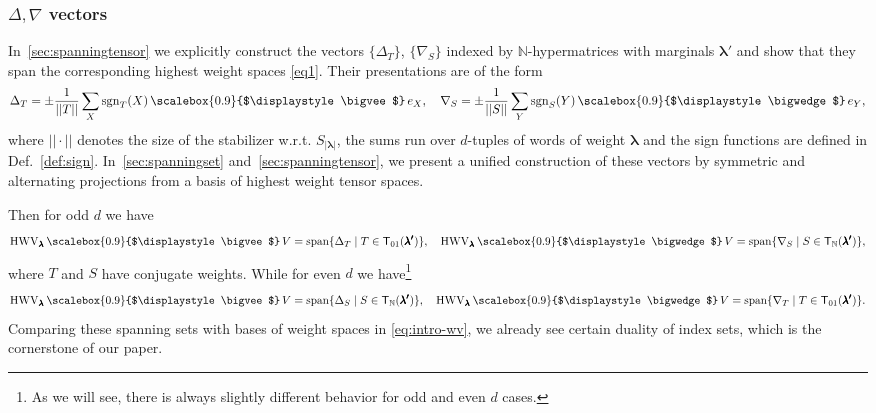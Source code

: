 \documentclass[12pt, reqno]{amsart}
\theoremstyle{definition}
\newcommand{\sgn}{\mathrm{sgn}}
\let\oldbigwedge\bigwedge
\let\oldbigvee\bigvee
\renewcommand{\bigwedge}{
  \mathop{
    \vcenter{
      \hbox{\scalebox{0.9}{$\displaystyle\oldbigwedge$}}
    }
  }
}
\renewcommand{\bigvee}{
  \mathop{
    \vcenter{
      \hbox{\scalebox{0.9}{$\displaystyle\oldbigvee$}}
    }
  }
}
\begin{document}

\subsubsection*{$\Delta, \nabla$ vectors}
    In \textsection\,\ref{sec:spanningtensor} we explicitly construct the vectors $\{\Delta_T \}$, $\{\nabla_S \}$ indexed by $\mathbb{N}$-hypermatrices with marginals $\pmb{\lambda'}$ and show that they span the corresponding highest weight spaces  \eqref{eq1}. Their presentations are of the form 
    \begin{align*} 
        \Delta_T = \pm \frac{1}{||T||} \sum_{X } \sgn_T(X) \bigvee e_X, %
       \quad %
        \nabla_S = \pm \frac{1}{||S||} \sum_{Y } \sgn_S(Y) \bigwedge e_Y, %
    \end{align*}
where $||\cdot||$ denotes the size of the stabilizer w.r.t. $S_{|\pmb{\lambda}|}$, the sums run over $d$-tuples of words of weight $\pmb{\lambda}$ and the sign functions are defined in Def.~\ref{def:sign}. 
In \textsection\,\ref{sec:spanningset} and \textsection\,\ref{sec:spanningtensor}, we present a unified construction of these vectors by symmetric and alternating projections from a basis of highest weight tensor spaces. 

\vspace{0.5em}

Then for odd $d$ we have  
    \begin{align*}
        \mathrm{HWV}_{\pmb{\lambda}} \bigvee V %
        = \mathrm{span}\{ 
            \Delta_T \mid T \in \mathsf{T}_{01}(\pmb{\lambda'})
        \}, \quad
        \mathrm{HWV}_{\pmb{\lambda}} \bigwedge V %
        = \mathrm{span}\{ 
            \nabla_S \mid S \in \mathsf{T}_\mathbb{N}(\pmb{\lambda'})
        \},
    \end{align*}
    where $T$ and $S$ have conjugate weights.
While for even $d$ we have\footnote{As we will see, there is always slightly different behavior for odd and even $d$ cases.}  
\begin{align*}
    \mathrm{HWV}_{\pmb{\lambda}} \bigvee V %
    = \mathrm{span}\{ 
        \Delta_S \mid S \in \mathsf{T}_\mathbb{N}(\pmb{\lambda'})
    \},\quad
    \mathrm{HWV}_{\pmb{\lambda}} \bigwedge V %
    = \mathrm{span}\{ 
        \nabla_T \mid T \in \mathsf{T}_{01}(\pmb{\lambda'})
    \}.
\end{align*}
Comparing these spanning sets with bases of weight spaces in \eqref{eq:intro-wv}, we already see certain duality of index sets, which is the cornerstone of our paper.
\end{document}
